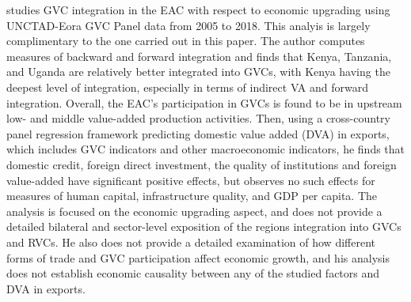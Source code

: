\documentclass[a4paper]{article}
\begin{document}


\citet{lwesya2022integration} studies GVC integration in the EAC with respect to economic upgrading using UNCTAD-Eora GVC Panel data from 2005 to 2018. This analyis is largely complimentary to the one carried out in this paper. The author computes measures of backward and forward integration and finds that Kenya, Tanzania, and Uganda are relatively better integrated into GVCs, with Kenya having the deepest level of integration, especially in terms of indirect VA and forward integration. Overall, the EAC's participation in GVCs is found to be in upstream low- and middle value-added production activities. Then, using a cross-country panel regression framework predicting domestic value added (DVA) in exports, which includes GVC indicators and other macroeconomic indicators, he finds that domestic credit, foreign direct investment, the quality of institutions and foreign value-added have significant positive effects, but observes no such effects for measures of human capital, infrastructure quality, and GDP per capita. The analysis is focused on the economic upgrading aspect, and does not provide a detailed bilateral and sector-level exposition of the regions integration into GVCs and RVCs. He also does not provide a detailed examination of how different forms of trade and GVC participation affect economic growth, and his analysis does not establish economic causality between any of the studied factors and DVA in exports. \newline
\end{document}
